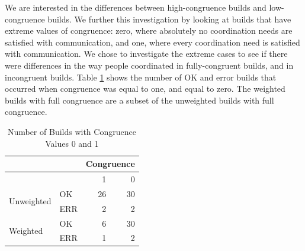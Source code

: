 We are interested in the differences between high-congruence builds and low-congruence builds.
We further this investigation by looking at builds that have extreme values of congruence: zero, where absolutely no coordination needs are satisfied with communication, and one, where every coordination need is satisfied with communication.
We chose to investigate the extreme cases to see if there were differences in the way people coordinated in fully-congruent builds, and in incongruent builds.
Table \ref{tab:congruence_extremes} shows the number of OK and error builds that occurred when congruence was equal to one, and equal to zero. The weighted builds with full congruence are a subset of the unweighted builds with full congruence.



\begin{table}[t]
\centering
\begin{tabular}{ll|rr}
& & \multicolumn{2}{c}{Congruence} \\\hline
&  & 1 & 0 \\\hline 
\multirow{2}{*}{Unweighted} & OK & 26 & 30 \\
                            & ERR & 2 & 2 \\\hline
\multirow{2}{*}{Weighted} & OK & 6 & 30 \\
                         & ERR & 1 & 2 \\
\end{tabular}
\caption{Number of Builds with Congruence Values 0 and 1}
\label{tab:congruence_extremes}
\end{table}



